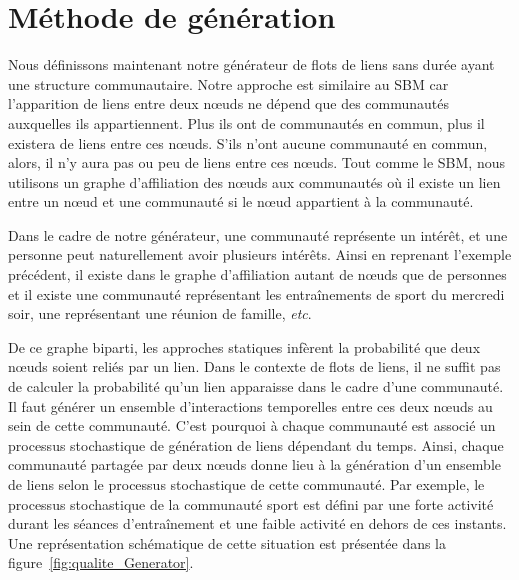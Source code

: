 
\section{Méthode de génération}
\label{sec:versqualite_methode}

Nous définissons maintenant notre générateur de flots de liens sans durée ayant une structure communautaire.
Notre approche est similaire au SBM car l'apparition de liens entre deux n\oe{}uds ne dépend que des communautés auxquelles ils appartiennent.
Plus ils ont de communautés en commun, plus il existera de liens entre ces n\oe{}uds.
S'ils n'ont aucune communauté en commun, alors, il n'y aura pas ou peu de liens entre ces n\oe{}uds.
Tout comme le SBM, nous utilisons un graphe d'affiliation des n\oe{}uds aux communautés où il existe un lien entre un n\oe{}ud et une communauté si le n\oe{}ud appartient à la communauté.

Dans le cadre de notre générateur, une communauté représente un intérêt, et une personne peut naturellement avoir plusieurs intérêts.
Ainsi en reprenant l'exemple précédent, il existe dans le graphe d'affiliation autant de n\oe{}uds que de personnes et il existe une communauté représentant les entraînements de sport du mercredi soir, une représentant une réunion de famille, \emph{etc}.

De ce graphe biparti, les approches statiques infèrent la probabilité que deux n\oe{}uds soient reliés par un lien.
Dans le contexte de flots de liens, il ne suffit pas de calculer la probabilité qu'un lien apparaisse dans le cadre d'une communauté.
Il faut générer un ensemble d'interactions temporelles entre ces deux n\oe{}uds au sein de cette communauté.
C'est pourquoi à chaque communauté est associé un processus stochastique de génération de liens dépendant du temps.
Ainsi, chaque communauté partagée par deux n\oe{}uds donne lieu à la génération d'un ensemble de liens selon le processus stochastique de cette communauté.
Par exemple, le processus stochastique de la communauté sport est défini par une forte activité durant les séances d'entraînement et une faible activité en dehors de ces instants.
Une représentation schématique de cette situation est présentée dans la figure~\ref{fig:qualite_Generator}.



